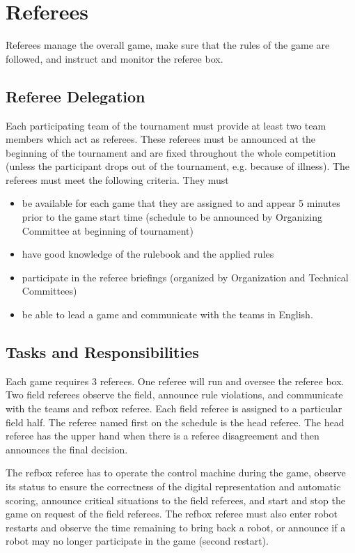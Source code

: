 \documentclass[12pt,twoside]{article}
\begin{document}

\section{Referees}
Referees manage the overall game, make sure that the rules of the game
are followed, and instruct and monitor the referee box.

\subsection{Referee Delegation}
Each participating team of the tournament must provide at least two
team members which act as referees. These referees must be announced
at the beginning of the tournament and are fixed throughout the whole
competition (unless the participant drops out of the tournament,
e.g. because of illness). The referees must meet the following
criteria. They must

\begin{itemize}
\item be available for each game that they are assigned to and appear
  5 minutes prior to the game start time (schedule to be announced by
  Organizing Committee at beginning of tournament)
\item have good knowledge of the rulebook and the applied rules
\item participate in the referee briefings (organized by Organization
  and Technical Committees)
\item be able to lead a game and communicate with the teams in
  English.
\end{itemize}

\subsection{Tasks and Responsibilities}
Each game requires 3 referees. One referee will run and oversee the
referee box. Two field referees observe the field, announce rule
violations, and communicate with the teams and refbox referee. Each
field referee is assigned to a particular field half. The referee
named first on the schedule is the head referee. The head referee has
the upper hand when there is a referee disagreement and then announces
the final decision.

The refbox referee has to operate the control machine during the game,
observe its status to ensure the correctness of the digital
representation and automatic scoring, announce critical situations to
the field referees, and start and stop the game on request of the
field referees. The refbox referee must also enter robot restarts and
observe the time remaining to bring back a robot, or announce if a
robot may no longer participate in the game (second restart).
\end{document}
